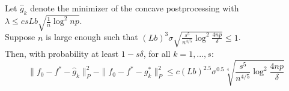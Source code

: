 





\begin{theorem}
\label{thm:concave_consistent}
Let $\hat{g}_k$ denote the minimizer of the concave postprocessing with $\lambda \leq c sLb \sqrt{\frac{1}{n} \log^2 np}$.\\

Suppose $n$ is large enough such that $(Lb)^3 \sigma \sqrt{ \frac{s^5}{n^{4/5}} \log^2 \frac{4np}{\delta} } \leq 1$.\\

Then, with probability at least $1- s\delta$, for all $k=1,...,s$:\\
\[
\| f_0 - f^* - \hat{g}_k \|_P^2 - \| f_0 - f^* - g^*_k \|_P^2 \leq  c (Lb)^{2.5} \sigma^{0.5} \sqrt[4]{ \frac{s^5}{n^{4/5}} \log^2 \frac{4np}{\delta}} 
\]
\end{theorem}

